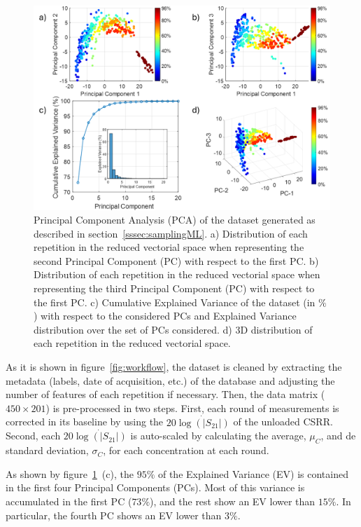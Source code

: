 \documentclass[journal,twoside,web]{ieeecolor}
\begin{document}
\begin{figure}[!t]
	\centering
	\includegraphics [trim = 0mm 0mm 0mm 0mm, clip, width=1\columnwidth]{figures/fig5_2.png}
	\caption{Principal Component Analysis (PCA) of the dataset generated as described in section~\ref{sssec:samplingML}. a) Distribution of each repetition in the reduced vectorial space when representing the second Principal Component (PC) with respect to the first PC. b) Distribution of each repetition in the reduced vectorial space when representing the third Principal Component (PC) with respect to the first PC. c) Cumulative Explained Variance of the dataset (in $\%$) with respect to the considered PCs and Explained Variance distribution over the set of PCs considered. d) 3D distribution of each repetition in the reduced vectorial space.}
	\label{fig:pcaAnalysis}
	\vspace{-0.3cm}
\end{figure}

As it is shown in figure~\ref{fig:workflow}, the dataset is cleaned by extracting the metadata (labels, date of acquisition, etc.) of the database and adjusting the number of features of each repetition if necessary. Then, the data matrix ($450\times201$) is pre-processed in two steps. First, each round of measurements is corrected in its baseline by using the $20\dot{\log\left(|S_{21}|\right)}$ of the unloaded CSRR. Second, each $20\dot{\log\left(|S_{21}|\right)}$ is auto-scaled by calculating the average, $\mu_{C}$, and de standard deviation, $\sigma_{C}$, for each concentration at each round.

As shown by figure~\ref{fig:pcaAnalysis}~(c), the $95\%$ of the Explained Variance (EV) is contained in the first four Principal Components (PCs). Most of this variance is accumulated in the first PC ($73\%$), and the rest show an EV lower than $15\%$. In particular, the fourth PC shows an EV lower than $3\%$.
\end{document}
